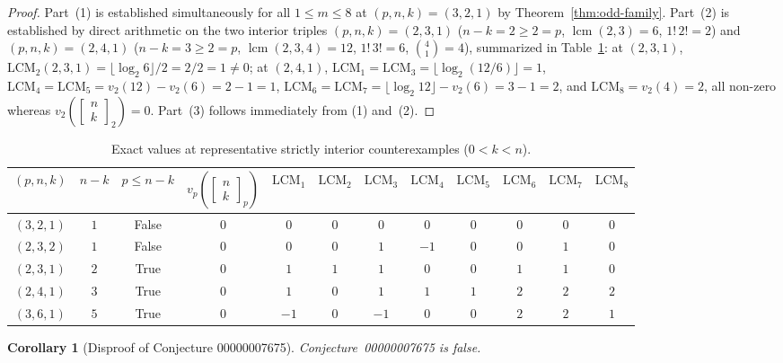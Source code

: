 \documentclass[11pt,a4paper]{article}
\newtheorem{corollary}[theorem]{Corollary}
\theoremstyle{definition}
\theoremstyle{remark}
\newcommand{\qbinom}[3]{\begin{bmatrix} #1 \\ #2 \end{bmatrix}_{#3}}
\newcommand{\lcm}{\operatorname{lcm}}
\begin{document}
\begin{proof}
Part~(1) is established simultaneously for all $1 \le m \le 8$ at $(p,n,k) = (3,2,1)$
by Theorem~\ref{thm:odd-family}. Part~(2) is established by direct arithmetic on the
two interior triples $(p,n,k) = (2,3,1)$ ($n - k = 2 \ge 2 = p$, $\lcm(2,3) = 6$,
$1!\,2! = 2$) and $(p,n,k) = (2,4,1)$ ($n - k = 3 \ge 2 = p$, $\lcm(2,3,4) = 12$,
$1!\,3! = 6$, $\binom{4}{1} = 4$), summarized in Table~\ref{tab:witnesses}:
at $(2,3,1)$, $\mathrm{LCM}_2(2,3,1) = \lfloor \log_2 6 \rfloor / 2 = 2/2 = 1 \neq 0$;
at $(2,4,1)$, $\mathrm{LCM}_1 = \mathrm{LCM}_3 = \lfloor \log_2(12/6)\rfloor = 1$,
$\mathrm{LCM}_4 = \mathrm{LCM}_5 = v_2(12) - v_2(6) = 2 - 1 = 1$,
$\mathrm{LCM}_6 = \mathrm{LCM}_7 = \lfloor \log_2 12\rfloor - v_2(6) = 3 - 1 = 2$,
and $\mathrm{LCM}_8 = v_2(4) = 2$, all non-zero whereas
$v_2\!\left(\qbinom{n}{k}{2}\right) = 0$. Part~(3) follows immediately from (1)
and~(2).
\end{proof}

\begin{table}[ht]
\centering
\footnotesize
\setlength{\tabcolsep}{4.5pt}
\renewcommand{\arraystretch}{1.25}
\begin{tabular}{@{}cccccccccccc@{}}
\hline
$(p,n,k)$ & $n-k$ & $p \le n-k$ & $v_p\!\left(\qbinom{n}{k}{p}\right)$
  & $\mathrm{LCM}_1$ & $\mathrm{LCM}_2$ & $\mathrm{LCM}_3$ & $\mathrm{LCM}_4$
  & $\mathrm{LCM}_5$ & $\mathrm{LCM}_6$ & $\mathrm{LCM}_7$ & $\mathrm{LCM}_8$ \\
\hline
$(3,2,1)$ & $1$ & False & $0$ & $0$ & $0$ & $0$ & $0$ & $0$ & $0$ & $0$ & $0$ \\
$(2,3,2)$ & $1$ & False & $0$ & $0$ & $0$ & $1$ & $-1$ & $0$ & $0$ & $1$ & $0$ \\
$(2,3,1)$ & $2$ & True  & $0$ & $1$ & $1$ & $1$ & $0$ & $0$ & $1$ & $1$ & $0$ \\
$(2,4,1)$ & $3$ & True  & $0$ & $1$ & $0$ & $1$ & $1$ & $1$ & $2$ & $2$ & $2$ \\
$(3,6,1)$ & $5$ & True  & $0$ & $-1$ & $0$ & $-1$ & $0$ & $0$ & $2$ & $2$ & $1$ \\
\hline
\end{tabular}
\caption{Exact values at representative strictly interior counterexamples ($0 < k < n$).}
\label{tab:witnesses}
\end{table}

\begin{corollary}[Disproof of Conjecture 00000007675]
\label{cor:main-disproof}
Conjecture~00000007675 is false.
\end{corollary}
\end{document}
